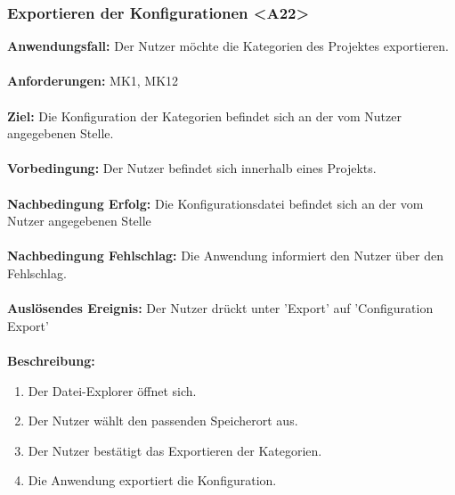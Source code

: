 \documentclass[parskip=full]{scrartcl} %
\begin{document}
\subsubsection*{Exportieren der Konfigurationen <A22>}
\textbf{Anwendungsfall:} Der Nutzer möchte die Kategorien des Projektes exportieren.\\\\
\textbf{Anforderungen:} MK1, MK12\\\\
\textbf{Ziel:} Die Konfiguration der Kategorien befindet sich an der vom Nutzer angegebenen Stelle.\\\\
\textbf{Vorbedingung:} Der Nutzer befindet sich innerhalb eines Projekts.\\\\
\textbf{Nachbedingung Erfolg:} Die Konfigurationsdatei befindet sich an der vom Nutzer angegebenen Stelle\\\\
\textbf{Nachbedingung Fehlschlag:}  Die Anwendung informiert den Nutzer über den Fehlschlag.\\\\
\textbf{Auslösendes Ereignis:} Der Nutzer drückt unter 'Export' auf 'Configuration Export' \\\\
\textbf{Beschreibung:}
\begin{enumerate}
    \item Der Datei-Explorer öffnet sich.
    \item Der Nutzer wählt den passenden Speicherort aus.
    \item Der Nutzer bestätigt das Exportieren der Kategorien.
    \item Die Anwendung exportiert die Konfiguration.
\end{enumerate}
\newpage
\end{document}
